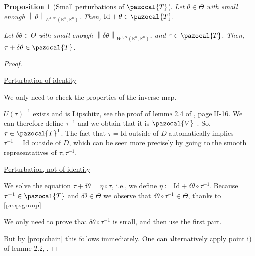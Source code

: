 \documentclass[english,a4paper,10pt,oneside]{scrbook}	%
\theoremstyle{break}
\newtheorem{prop}[equation]{Proposition}
\newenvironment{mproof}[1][\proofname]{%
  \begin{proof}[#1]$ $\par\nobreak\ignorespaces
}{%
  \end{proof}
}
\renewcommand*{\proofname}{Proof}
\theoremstyle{remark}
\newcommand{\mR}{\mathbb{R}}
\newcommand{\cV}{\pazocal{V}}
\newcommand{\norm}[1]{\left\lVert#1\right\rVert}
\newcommand{\cT}{\pazocal{T}}
\newcommand{\id}{\text{Id}}
\newcommand{\te}{\theta}
\newcommand{\Te}{\Theta}
\begin{document}
\begin{prop}[Small perturbations of $\cT$]
\label{prop:ptb_id}
Let $\te \in \Te$ with small enough $\norm{\te}_{W^{1,\infty}(\mR^n;\mR^n)}$. Then, $\id+\te\in \cT$.

Let $\delta \te \in \Te$ with small enough $\norm{\delta\te}_{W^{1,\infty}(\mR^n;\mR^n)}$, and $\tau \in \cT$. Then, $\tau + \delta \te\in \cT$.

\end{prop}
\begin{mproof}

\underline{Perturbation of identity}

We only need to check the properties of the inverse map.

$U(\tau)^{-1}$ exists and is Lipschitz, see the proof of lemme 2.4 of \cite{murat}, page II-16. We can therefore define $\tau^{-1}$ and we obtain that it is $\cV^1$. So, $\tau \in \cT^1$. The fact that $\tau = \id$ outside of $D$ automatically implies $\tau^{-1}=\id$ outside of $D$, which can be seen more precisely by going to the smooth representatives of $\tau, \tau^{-1}$.

%
%

\underline{Perturbation, not of identity}

We solve the equation $\tau + \delta \te =\eta \circ \tau$, i.e., we define $\eta:=\id + \delta \te \circ \tau^{-1}$. Because $\tau^{-1} \in \cT$ and $\delta \te \in \Te$ we observe that $\delta \te \circ \tau^{-1} \in \Te $, thanks to \cref{prop:group}.

We only need to prove that $\delta \te \circ \tau^{-1}$ is small, and then use the first part. 

But by \cref{prop:chain} this follows immediately. One can alternatively apply point i) of lemme 2.2, \cite{murat}.

\end{mproof}
\end{document}
